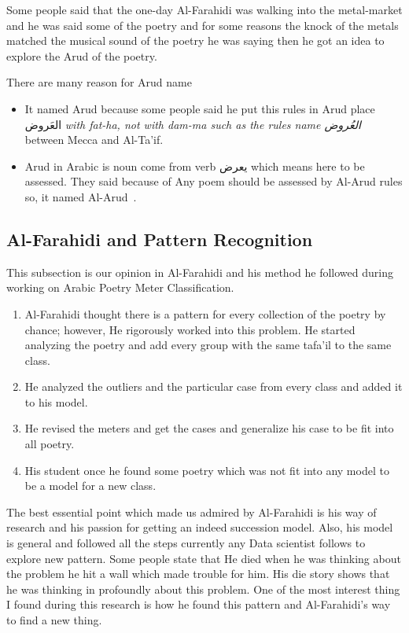   Some people said that the one-day Al-Farahidi was walking into the metal-market and he was said some of the poetry and for some reasons the knock of the metals matched the musical sound of the poetry he was saying then he got an idea to explore the Arud of the poetry.

 There are many reason for Arud name 
  \begin{itemize}
  \item It named Arud because some people said he put this rules in Arud place \textarabic{العَروض} \textit{with fat-ha, not with dam-ma such as the rules name \textarabic{العُروض} } between Mecca and Al-Ta'if\cite{AlQuaed}.
  \item Arud in Arabic is noun come from verb \textarabic{يعرض} which means here to be assessed. They said because of Any poem should be assessed by Al-Arud rules so, it named Al-Arud~\cite{Alkafi1994}.
  \end{itemize}
  
  

  
    
    \subsection{Al-Farahidi and Pattern Recognition}
    This subsection is our opinion in Al-Farahidi and his method he followed during working on Arabic Poetry Meter Classification.

\begin{enumerate}


\item Al-Farahidi thought there is a pattern for every collection of the poetry by chance; however, He rigorously worked into this problem. He started analyzing the poetry and add every group with the same tafa'il to the same class.
\item He analyzed the outliers and the particular case from every class and added it to his model.
\item He revised the meters and get the cases and generalize his case to be fit into all poetry.
\item His student once he found some poetry which was not fit into any model to be a model for a new class.

\end{enumerate}
The best essential point which made us admired by Al-Farahidi is his way of research and his passion for getting an indeed succession model. Also, his model is general and followed all the steps currently any Data scientist follows to explore new pattern. Some people state that He died when he was thinking about the problem he hit a wall which made trouble for him. His die story shows that he was thinking in profoundly about this problem. One of the most interest thing I found during this research is how he found this pattern and Al-Farahidi’s way to find a new thing.

